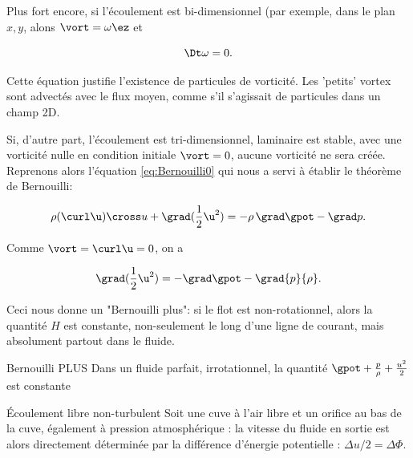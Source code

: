 Plus fort encore, si l'écoulement est bi-dimensionnel (par exemple, dans le plan $x,y$, alons $\vort = \omega \ez$ et

\begin{equation}
 \Dt\omega = 0. 
\label{eq:vort2d}
\end{equation}


Cette équation justifie l'existence de particules  de vorticité. Les 'petits' vortex sont advectés avec le flux moyen, comme s'il s'agissait de particules dans un champ 2D. 

Si, d'autre part, l'écoulement est tri-dimensionnel, laminaire est stable, avec une vorticité nulle en condition initiale $\vort=0$, aucune vorticité ne sera créée. Reprenons alors l'équation \eqref{eq:Bernouilli0} qui nous a servi à établir le théorème de Bernouilli: 

\begin{displaymath}
  \rho (\curl \u)\cross u + \grad(\frac{1}{2}\u^2) = - \rho \, \grad \gpot - \grad p.
\label{eq:Bernouilli0}
\end{displaymath}

Comme $\vort = \curl \u =0$, on a 

\begin{displaymath}
  \grad(\frac{1}{2}\u^2) = - \grad \gpot - \grad {p}{\rho}.
\end{displaymath}

Ceci nous donne un "Bernouilli plus": si le flot est non-rotationnel, alors la quantité $H$ est constante, non-seulement le long d'une ligne de courant, mais absolument partout dans le fluide. 

\begin{key}{Bernouilli PLUS}
  Dans un fluide parfait, irrotationnel, la quantité $\gpot + \frac{p}{\rho} + \frac{u^2}{2}$ est constante
\end{key}



\begin{application}{Écoulement libre non-turbulent}
Soit une cuve à l'air libre et un orifice au bas de la cuve, également à pression atmosphérique : la vitesse du fluide en sortie est alors directement déterminée par la différence d'énergie potentielle : $\Delta u/2 = \Delta \Phi$. 

\centering
    \captionsetup{type=figure}
    
\end{application}


